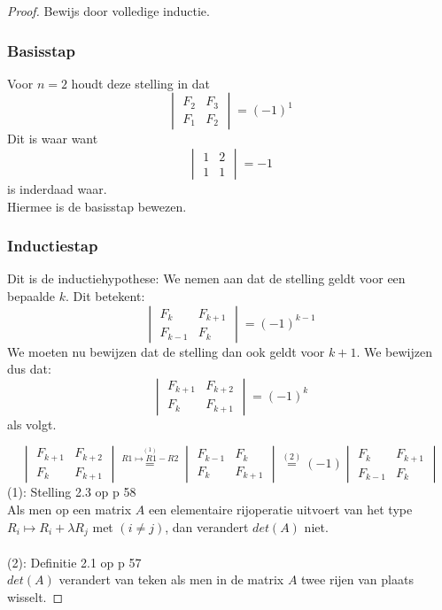 \documentclass[10pt,a4paper]{article}
\begin{document}
\begin{proof}
Bewijs door volledige inductie.
\subsubsection*{Basisstap}
Voor $n=2$ houdt deze stelling in dat
\[
\begin{vmatrix}
F_{2}   & F_{3}\\
F_{1} & F_{2}
\end{vmatrix}
=
(-1)^{1}
\]
Dit is waar want
\[
\begin{vmatrix}
1 & 2\\
1 & 1
\end{vmatrix}
=
-1
\]
is inderdaad waar.\\
Hiermee is de basisstap bewezen.

\subsubsection*{Inductiestap}
Dit is de inductiehypothese: We nemen aan dat de stelling geldt voor een bepaalde $k$. Dit betekent:
\[
\begin{vmatrix}
F_{k}   & F_{k+1}\\
F_{k-1} & F_{k}
\end{vmatrix}
=
(-1)^{k-1}
\]
We moeten nu bewijzen dat de stelling dan ook geldt voor $k+1$.
We bewijzen dus dat:
\[
\begin{vmatrix}
F_{k+1}   & F_{k+2}\\
F_{k} & F_{k+1}
\end{vmatrix}
=
(-1)^{k}
\]
als volgt.

\[
\begin{vmatrix}
F_{k+1}   & F_{k+2}\\
F_{k} & F_{k+1}
\end{vmatrix}
\overset{\overset{(1)}{R1 \longmapsto R1-R2}}{=}
\begin{vmatrix}
F_{k-1}   & F_{k}\\
F_{k} & F_{k+1}
\end{vmatrix}
\overset{(2)}{=}
(-1)
\begin{vmatrix}
F_{k} & F_{k+1}\\
F_{k-1}   & F_{k}
\end{vmatrix}
\]
(1): Stelling 2.3 op p 58\\
Als men op een matrix $A$ een elementaire rijoperatie uitvoert van het type $R_{i} \longmapsto R_{i}+\lambda R_{j}$ met $(i \neq j)$, dan verandert $det(A)$ niet.\\\\
(2): Definitie 2.1 op p 57\\
$det(A)$ verandert van teken als men in de matrix $A$ twee rijen van plaats wisselt.


\end{proof}
\end{document}
